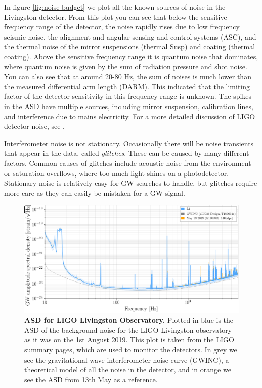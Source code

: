\documentclass[11pt]{cuthesis}
\begin{document}
In figure \ref{fig:noise budget} we plot all the known sources of noise in the Livingston detector. From this plot you can see that below the sensitive frequency range of the detector, the noise rapidly rises due to low frequency seismic noise, the alignment and angular sensing and control systems (ASC), and the thermal noise of the mirror suspensions (thermal Susp) and coating (thermal coating). Above the sensitive frequency range it is quantum noise that dominates, where quantum noise is given by the sum of radiation pressure and shot noise. You can also see that at around 20-80 Hz, the sum of noises is much lower than the measured differential arm length (DARM). This indicated that the limiting factor of the detector sensitivity in this frequency range is unknown. The spikes in the ASD have multiple sources, including mirror suspension, calibration lines, and interference due to mains electricity. For a more detailed discussion of LIGO detector noise, see \cite{GW150914-detector,noise_budget_martynov}.

Interferometer noise is not stationary. Occasionally there will be noise transients that appear in the data, called \textit{glitches}. These can be caused by many different factors. Common causes of glitches include acoustic noise from the environment or saturation overflows, where too much light shines on a photodetector. \cite{detchar} Stationary noise is relatively easy for GW searches to handle, but glitches require more care as they can easily be mistaken for a GW signal. 

\begin{landscape}
\begin{figure}[ht]
\centering
\includegraphics[width=16cm]{L1-ASD-20170820.png} 
\caption{\textbf{ASD for LIGO Livingston Observatory.} Plotted in blue is the ASD of the background noise for the LIGO Livingston observatory as it was on the 1st August 2019. This plot is taken from the LIGO summary pages, which are used to monitor the detectors. In grey we see the gravitational wave interferometer noise curve (GWINC), a theoretical model of all the noise in the detector, and in orange we see the ASD from 13th May as a reference. }
\label{fig:asd}
\end{figure}
\end{landscape}
\end{document}
